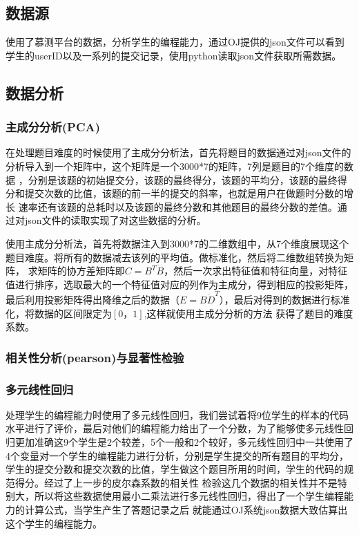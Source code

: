 \documentclass[UTF8]{ctexart}
\begin{document}
\subsection{数据源}
使用了慕测平台的数据，分析学生的编程能力，通过OJ提供的json文件可以看到学生的userID以及一系列的提交记录，使用python读取json文件获取所需数据。
\subsection{数据分析}
\subsubsection{主成分分析(PCA)}
在处理题目难度的时候使用了主成分分析法，首先将题目的数据通过对json文件的分析导入到一个矩阵中，这个矩阵是一个3000*7的矩阵，7列是题目的7个维度的数据
，分别是该题的初始提交分，该题的最终得分，该题的平均分，该题的最终得分和提交次数的比值，该题的前一半的提交的斜率，也就是用户在做题时分数的增长
速率还有该题的总耗时以及该题的最终分数和其他题目的最终分数的差值。通过对json文件的读取实现了对这些数据的分析。

使用主成分分析法，首先将数据注入到3000*7的二维数组中，从7个维度展现这个题目难度。将所有的数据减去该列的平均值。做标准化，然后将二维数组转换为矩阵，
求矩阵的协方差矩阵即$C=B^T \dot B$，然后一次求出特征值和特征向量，对特征值进行排序，选取最大的一个特征值对应的列作为主成分，得到相应的投影矩阵，
最后利用投影矩阵得出降维之后的数据（$E = B \dot D^T$），最后对得到的数据进行标准化，将数据的区间限定为$[0，1]$,这样就使用主成分分析的方法
获得了题目的难度系数。
\subsubsection{相关性分析(pearson)与显著性检验}
\subsubsection{多元线性回归}
处理学生的编程能力时使用了多元线性回归，我们尝试着将9位学生的样本的代码水平进行了评价，最后对他们的编程能力给出了一个分数，为了能够使多元线性回
归更加准确这9个学生是2个较差，5个一般和2个较好，多元线性回归中一共使用了4个变量对一个学生的编程能力进行分析，分别是学生提交的所有题目的平均分，
学生的提交分数和提交次数的比值，学生做这个题目所用的时间，学生的代码的规范得分。经过了上一步的皮尔森系数的相关性
检验这几个数据的相关性并不是特别大，所以将这些数据使用最小二乘法进行多元线性回归，得出了一个学生编程能力的计算公式，当学生产生了答题记录之后
就能通过OJ系统json数据大致估算出这个学生的编程能力。
\end{document}
